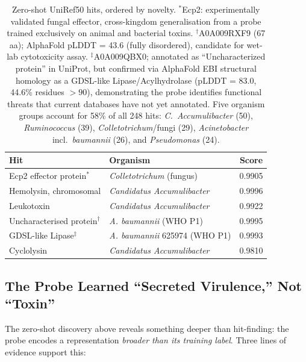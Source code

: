 \documentclass[11pt,a4paper]{article}
\begin{document}
\begin{table}[H]
\centering
\begin{tabular}{llc}
\toprule
\textbf{Hit} & \textbf{Organism} & \textbf{Score} \\
\midrule
Ecp2 effector protein$^\ast$ & \textit{Colletotrichum} (fungus) & 0.9905 \\
Hemolysin, chromosomal        & \textit{Candidatus Accumulibacter} & 0.9996 \\
Leukotoxin                    & \textit{Candidatus Accumulibacter} & 0.9922 \\
Uncharacterised protein$^\dagger$ & \textit{A. baumannii} (WHO P1) & 0.9995 \\
GDSL-like Lipase$^\ddagger$   & \textit{A. baumannii} 625974 (WHO P1) & 0.9993 \\
Cyclolysin                    & \textit{Candidatus Accumulibacter} & 0.9810 \\
\bottomrule
\end{tabular}
\caption{Zero-shot UniRef50 hits, ordered by novelty. $^\ast$Ecp2: experimentally validated fungal effector, cross-kingdom generalisation from a probe trained exclusively on animal and bacterial toxins. $^\dagger$A0A009RXF9 (67 aa); AlphaFold pLDDT = 43.6 (fully disordered), candidate for wet-lab cytotoxicity assay. $^\ddagger$A0A009QBX0; annotated as ``Uncharacterized protein'' in UniProt, but confirmed via AlphaFold EBI structural homology as a GDSL-like Lipase/Acylhydrolase (pLDDT = 83.0, 44.6\% residues $>90$), demonstrating the probe identifies functional threats that current databases have not yet annotated. Five organism groups account for 58\% of all 248 hits: \textit{C.\ Accumulibacter} (50), \textit{Ruminococcus} (39), \textit{Colletotrichum}/fungi (29), \textit{Acinetobacter} incl.\ \textit{baumannii} (26), and \textit{Pseudomonas} (24).}
\end{table}

\subsection{The Probe Learned ``Secreted Virulence,'' Not ``Toxin''}

The zero-shot discovery above reveals something deeper than hit-finding: the probe
encodes a representation \textit{broader than its training label}. Three lines of evidence
support this:
\end{document}

